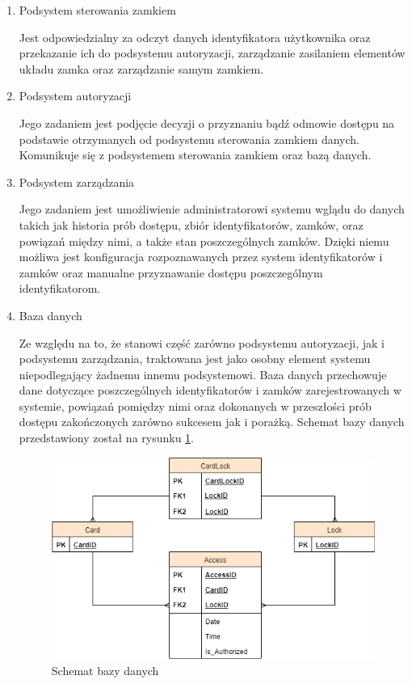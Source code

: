                 \begin{enumerate}

                    \item Podsystem sterowania zamkiem

                        Jest odpowiedzialny za odczyt danych identyfikatora użytkownika oraz przekazanie ich do podsystemu autoryzacji, zarządzanie zasilaniem elementów układu zamka oraz zarządzanie samym zamkiem.

                    \item Podsystem autoryzacji

                        Jego zadaniem jest podjęcie decyzji o przyznaniu bądź odmowie dostępu na podstawie otrzymanych od podsystemu sterowania zamkiem danych. Komunikuje się z podsystemem sterowania zamkiem oraz bazą danych.

                    \item Podsystem zarządzania

                        Jego zadaniem jest umożliwienie administratorowi systemu wglądu do danych takich jak historia prób dostępu, zbiór identyfikatorów, zamków, oraz powiązań między nimi, a także stan poszczególnych zamków. Dzięki niemu możliwa jest konfiguracja rozpoznawanych przez system identyfikatorów i zamków oraz manualne przyznawanie dostępu poszczególnym identyfikatorom.

                    \item Baza danych

                        Ze względu na to, że stanowi część zarówno podsystemu autoryzacji, jak i podsystemu zarządzania, traktowana jest jako osobny element systemu niepodlegający żadnemu innemu podsystemowi. Baza danych przechowuje dane dotyczące poszczególnych identyfikatorów i zamków zarejestrowanych w systemie, powiązań pomiędzy nimi oraz dokonanych w przeszłości prób dostępu zakończonych zarówno sukcesem jak i porażką. Schemat bazy danych przedstawiony został na rysunku \ref{fig:schema}.

                        \begin{figure}
                            \centering
                            \includegraphics[width=.8\linewidth]{chapters/images/schema.png}
                            \caption{Schemat bazy danych}
                            \label{fig:schema}
                        \end{figure}

                \end{enumerate}

